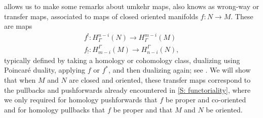  allows us to make some remarks about umkehr maps, also knows as wrong-way or transfer maps, associated to maps of closed oriented manifolds $f:N\to M$. These are maps
\begin{align*}
f^!:H^{n-i}_\Gamma(N)\to H^{m-i}_\Gamma(M)\\
f_!:H_{m-i}^\Gamma(M)\to H_{n-i}^\Gamma(N),
\end{align*}
typically defined by taking a homology or cohomology class, dualizing using Poincar\'e duality, applying $f$ or $f^*$, and then dualizing again; see \cite[Definition VI.11.2]{Bred97}. We will show that when $M$ and $N$ are closed and oriented, these transfer maps correspond to the pullbacks and pushforwards already encountered in \cref{S: functoriality}, where we only required for homology pushforwards that $f$ be proper and co-oriented and for homology pullbacks that $f$ be proper and  that $M$ and $N$ be oriented.

